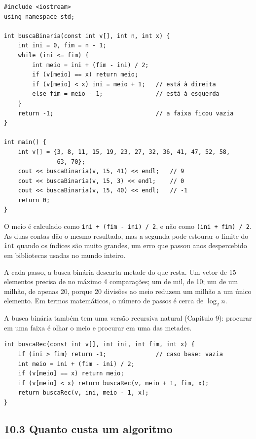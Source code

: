 \begin{codigo}
\begin{Verbatim}[breaklines=true, breaksymbolleft={}, fontsize=\footnotesize]
#include <iostream>
using namespace std;

int buscaBinaria(const int v[], int n, int x) {
    int ini = 0, fim = n - 1;
    while (ini <= fim) {
        int meio = ini + (fim - ini) / 2;
        if (v[meio] == x) return meio;
        if (v[meio] < x) ini = meio + 1;   // está à direita
        else fim = meio - 1;               // está à esquerda
    }
    return -1;                             // a faixa ficou vazia
}

int main() {
    int v[] = {3, 8, 11, 15, 19, 23, 27, 32, 36, 41, 47, 52, 58,
               63, 70};
    cout << buscaBinaria(v, 15, 41) << endl;   // 9
    cout << buscaBinaria(v, 15, 3) << endl;    // 0
    cout << buscaBinaria(v, 15, 40) << endl;   // -1
    return 0;
}
\end{Verbatim}
\end{codigo}

O meio é calculado como \texttt{ini + (fim - ini) / 2}, e não como \texttt{(ini + fim) / 2}. As duas contas dão o mesmo resultado, mas a segunda pode estourar o limite do \texttt{int} quando os índices são muito grandes, um erro que passou anos despercebido em bibliotecas usadas no mundo inteiro.

A cada passo, a busca binária descarta metade do que resta. Um vetor de 15 elementos precisa de no máximo 4 comparações; um de mil, de 10; um de um milhão, de apenas 20, porque 20 divisões ao meio reduzem um milhão a um único elemento. Em termos matemáticos, o número de passos é cerca de $\log_2 n$.

A busca binária também tem uma versão recursiva natural (Capítulo 9): procurar em uma faixa é olhar o meio e procurar em uma das metades.

\begin{codigo}
\begin{Verbatim}[breaklines=true, breaksymbolleft={}, fontsize=\footnotesize]
int buscaRec(const int v[], int ini, int fim, int x) {
    if (ini > fim) return -1;              // caso base: vazia
    int meio = ini + (fim - ini) / 2;
    if (v[meio] == x) return meio;
    if (v[meio] < x) return buscaRec(v, meio + 1, fim, x);
    return buscaRec(v, ini, meio - 1, x);
}
\end{Verbatim}
\end{codigo}

\subsection{10.3 Quanto custa um algoritmo}


